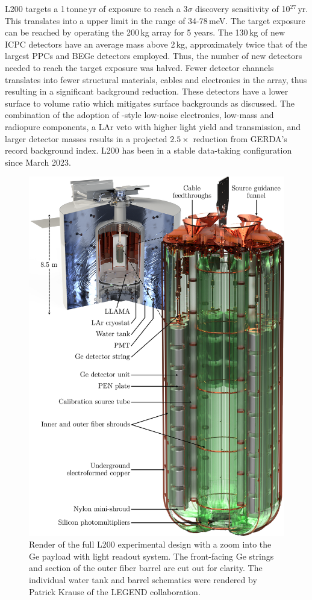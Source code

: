 L200 targets a 1\,tonne\,yr of exposure to reach a 3$\sigma$ \novbb{} discovery sensitivity of 10$^{27}$\,yr. This translates into a \mbb{} upper limit in the range of 34-78\,meV. The target exposure can be reached by operating the 200\,kg array for 5 years. The 130\,kg of new ICPC detectors have an average mass above 2\,kg, approximately twice that of the largest PPCs and BEGe detectors employed. Thus, the number of new detectors needed to reach the target exposure was halved. Fewer detector channels translates into fewer structural materials, cables and electronics in the array, thus resulting in a significant background reduction. These detectors have a lower surface to volume ratio which mitigates surface backgrounds as discussed. The combination of the adoption of {\MJMit}-style low-noise electronics, low-mass and radiopure components, a LAr veto with higher light yield and transmission, and larger detector masses results in a projected $2.5\times$ reduction from GERDA's record background index. L200 has been in a stable data-taking configuration since March 2023.
\begin{figure}[H]
	\centering
	\includegraphics[width=5.4in]{figs/legend/legend_width_6in_rq.png}
	\caption{Render of the full L200 experimental design with a zoom into the Ge payload with light readout system. The front-facing Ge strings and section of the outer fiber barrel are cut out for clarity. The individual water tank and barrel schematics were rendered by Patrick Krause of the LEGEND collaboration.}
	\label{fig:legend_barrel}
\end{figure}

